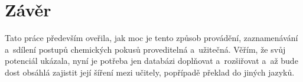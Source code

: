 \newpage
\chapter*{Závěr}

Tato práce především oveřila, jak moc je tento způsob provádění, zaznamenávání a~sdílení postupů chemických pokusů proveditelná a~užitečná. Věřím, že svůj potenciál ukázala, nyní je potřeba jen databázi doplňovat a~rozšiřovat a~až bude dost obsáhlá zajistit její šíření mezi učitely, popřípadě překlad do jiných jazyků.
